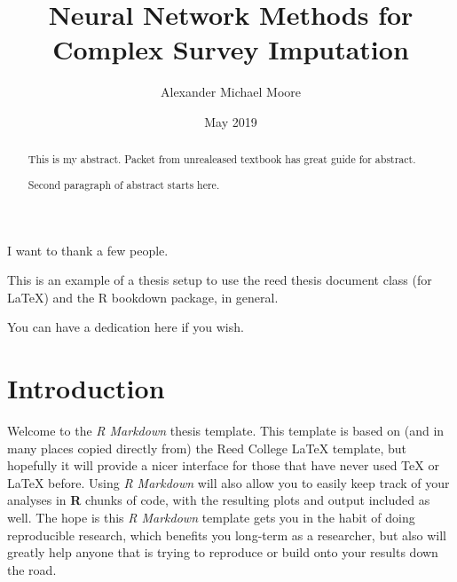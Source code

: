 \documentclass[12pt,twoside]{reedthesis}
\title{Neural Network Methods for Complex Survey Imputation}
\author{Alexander Michael Moore}
\date{May 2019}
\begin{document}
  \maketitle

\frontmatter %
\pagestyle{empty} %
  \begin{acknowledgements}
    I want to thank a few people.
  \end{acknowledgements}
  \begin{preface}
    This is an example of a thesis setup to use the reed thesis document
    class (for LaTeX) and the R bookdown package, in general.
  \end{preface}
  \hypersetup{linkcolor=black}
  \setcounter{tocdepth}{2}
  \tableofcontents

  \listoftables

  \listoffigures
  \begin{abstract}
    This is my abstract. Packet from unrealeased textbook has great guide
    for abstract. \par
    
    Second paragraph of abstract starts here.
  \end{abstract}
  \begin{dedication}
    You can have a dedication here if you wish.
  \end{dedication}
\mainmatter %
\pagestyle{fancyplain} %

\chapter*{Introduction}\label{introduction}

Welcome to the \emph{R Markdown} thesis template. This template is based
on (and in many places copied directly from) the Reed College LaTeX
template, but hopefully it will provide a nicer interface for those that
have never used TeX or LaTeX before. Using \emph{R Markdown} will also
allow you to easily keep track of your analyses in \textbf{R} chunks of
code, with the resulting plots and output included as well. The hope is
this \emph{R Markdown} template gets you in the habit of doing
reproducible research, which benefits you long-term as a researcher, but
also will greatly help anyone that is trying to reproduce or build onto
your results down the road.
\end{document}
